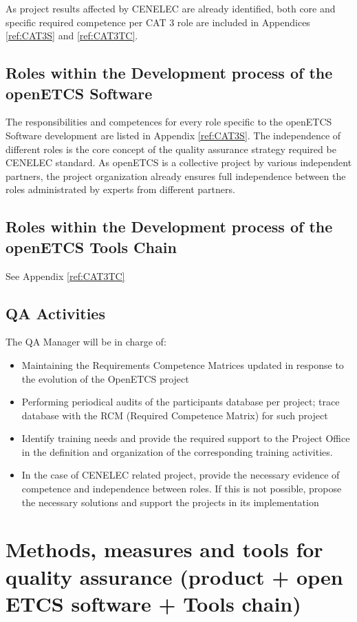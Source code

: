 \documentclass{template/openetcs_article}
\begin{document}
As project results affected by CENELEC are already identified, both core and specific required competence per CAT 3 role are included in Appendices \ref{ref:CAT3S} and \ref{ref:CAT3TC}.

\subsection{Roles within the Development process of the openETCS Software}
The responsibilities and competences for every role specific to the openETCS Software development are listed in Appendix \ref{ref:CAT3S}. The independence of different roles is the core concept of the quality assurance strategy required be CENELEC standard. As openETCS is a collective project by various independent partners, the project organization already ensures full independence between the roles administrated by experts from different partners. 

\subsection{Roles within the Development process of the openETCS Tools Chain}

See Appendix \ref{ref:CAT3TC}
\subsection{QA Activities}

The QA Manager will be in charge of:
\begin{itemize}
\item Maintaining the Requirements Competence Matrices updated in response to the evolution of the OpenETCS project
\item Performing periodical audits of the participants{\textquotesingle} database per project; trace database with the RCM (Required Competence Matrix) for such project
\item Identify training needs and provide the required support to the Project Office in the definition and organization of the corresponding training activities.
\item In the case of CENELEC related project, provide the necessary evidence of competence and independence between roles. If this is not possible, propose the necessary solutions and support the projects in its implementation
\end{itemize}

\section{Methods, measures and tools for quality assurance (product + open \gls{ETCS} software + Tools chain)}
\end{document}
